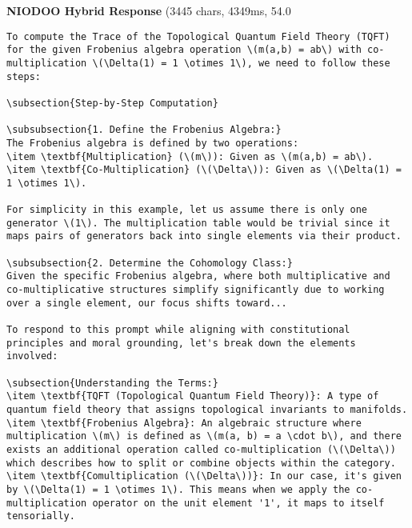 \documentclass[11pt,a4paper]{article}
\begin{document}
\textbf{NIODOO Hybrid Response} (3445 chars, 4349ms, 54.0%
\begin{verbatim}To compute the Trace of the Topological Quantum Field Theory (TQFT) for the given Frobenius algebra operation \(m(a,b) = ab\) with co-multiplication \(\Delta(1) = 1 \otimes 1\), we need to follow these steps:

\subsection{Step-by-Step Computation}

\subsubsection{1. Define the Frobenius Algebra:}
The Frobenius algebra is defined by two operations:
\item \textbf{Multiplication} (\(m\)): Given as \(m(a,b) = ab\).
\item \textbf{Co-Multiplication} (\(\Delta\)): Given as \(\Delta(1) = 1 \otimes 1\).

For simplicity in this example, let us assume there is only one generator \(1\). The multiplication table would be trivial since it maps pairs of generators back into single elements via their product.

\subsubsection{2. Determine the Cohomology Class:}
Given the specific Frobenius algebra, where both multiplicative and co-multiplicative structures simplify significantly due to working over a single element, our focus shifts toward...

To respond to this prompt while aligning with constitutional principles and moral grounding, let's break down the elements involved:

\subsection{Understanding the Terms:}
\item \textbf{TQFT (Topological Quantum Field Theory)}: A type of quantum field theory that assigns topological invariants to manifolds.
\item \textbf{Frobenius Algebra}: An algebraic structure where multiplication \(m\) is defined as \(m(a, b) = a \cdot b\), and there exists an additional operation called co-multiplication (\(\Delta\)) which describes how to split or combine objects within the category.
\item \textbf{Comultiplication (\(\Delta\))}: In our case, it's given by \(\Delta(1) = 1 \otimes 1\). This means when we apply the co-multiplication operator on the unit element '1', it maps to itself tensorially.


\end{verbatim}
\end{document}
